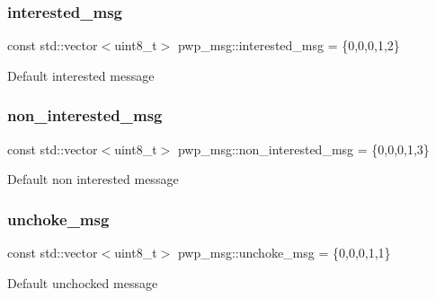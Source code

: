 \subsubsection{\texorpdfstring{interested\+\_\+msg}{interested\_msg}}
{\footnotesize\ttfamily const std\+::vector$<$uint8\+\_\+t$>$ pwp\+\_\+msg\+::interested\+\_\+msg = \{0,0,0,1,2\}}

Default interested message \mbox{\label{namespacepwp__msg_a16a5f22f784d872342a82af9f6b77830}} 
\subsubsection{\texorpdfstring{non\+\_\+interested\+\_\+msg}{non\_interested\_msg}}
{\footnotesize\ttfamily const std\+::vector$<$uint8\+\_\+t$>$ pwp\+\_\+msg\+::non\+\_\+interested\+\_\+msg = \{0,0,0,1,3\}}

Default non interested message \mbox{\label{namespacepwp__msg_acdc5eb698534e84a15db0e061c511e7c}} 
\subsubsection{\texorpdfstring{unchoke\+\_\+msg}{unchoke\_msg}}
{\footnotesize\ttfamily const std\+::vector$<$uint8\+\_\+t$>$ pwp\+\_\+msg\+::unchoke\+\_\+msg = \{0,0,0,1,1\}}

Default unchocked message 